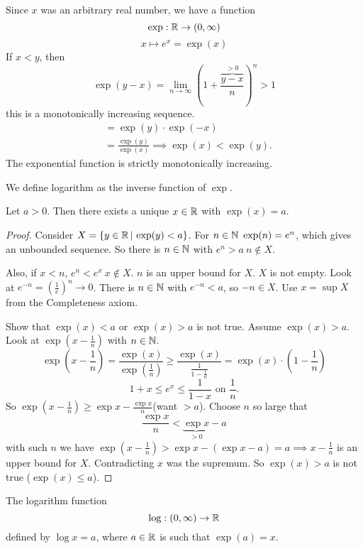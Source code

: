 \documentclass[10pt, a4paper]{article}
\begin{document}
Since $x$ was an arbitrary real number,
we have a function
\[
\exp : \mathbb{R} \rightarrow (0, \infty)
\]
\[
x \mapsto e ^ x = \exp(x)
\]
If $x < y$,
then
\[
\exp(y - x) = \lim_{n \rightarrow \infty}\left(1 + \frac{\overbrace{y - x}^{>0}}{n}\right) ^ n > 1
\]
this is a monotonically increasing sequence.
\begin{align*}
    &= \exp(y)\cdot\exp(-x) \\
    &= \frac{\exp(y)}{\exp(x)} \implies \exp(x) < \exp(y).
\end{align*}
The exponential function is strictly monotonically increasing.

We define logarithm as the inverse function of $\exp$.
\begin{theorem}
    Let $a > 0$.
    Then there exists a unique $x \in \mathbb{R}$ with $\exp(x) = a$.
    \begin{proof}
        Consider $X = \{y \in \mathbb{R}\,|\,\exp(y) < a\}$.
        For $n \in \mathbb{N}\ \exp(n) = e ^ n$,
        which gives an unbounded sequence.
        So there is $n \in \mathbb{N}$ with $e ^ n > a\ n \notin X$.
        
        Also,
        if $x < n$,
        $e ^ n < e ^ x\ x \notin X$.
        $n$ is an upper bound for $X$.
        $X$ is not empty.
        Look at $e ^ {-n} = \left(\frac{1}{e}\right) ^ n \rightarrow 0$.
        There is $n \in \mathbb{N}$ with $e ^ {-n} < a$,
        so $-n \in X$.
        Use $x = \sup X$ from the Completeness axiom.
        
        Show that $\exp(x) < a$ or $\exp(x) > a$ is not true.
        Assume $\exp(x) > a$.
        Look at $\exp\left(x - \frac{1}{n}\right)$ with $n \in \mathbb{N}$.
        \[
        \exp\left(x - \frac{1}{n}\right) = \frac{\exp(x)}{\exp\left(\frac{1}{n}\right)} \geq \frac{\exp(x)}{\frac{1}{1 - \frac{1}{n}}} = \exp(x) \cdot \left(1 - \frac{1}{n}\right)
        \]
        \[
        1 + x \leq e ^ x \leq \frac{1}{1 - x}\text{ on } \frac{1}{n}.
        \]
        So $\exp\left(x - \frac{1}{n}\right) \geq \exp x - \frac{\exp x}{n}$\quad(want $> a$).
        Choose $n$ so large that
        \[
        \frac{\exp x}{n} < \underbrace{\exp x}_{> 0} - a
        \]
        with such $n$ we have $\exp\left(x - \frac{1}{n}\right) > \exp x - (\exp x - a) = a \implies x - \frac{1}{n}$ is an upper bound for $X$. Contradicting $x$ was the supremum.
        So $\exp(x) > a$ is not true ($\exp(x) \leq a$).
    \end{proof}
\end{theorem}

\begin{definition}
    The logarithm function
    \[
    \log : (0, \infty) \rightarrow \mathbb{R}
    \]
    defined by
    $\log x = a$,
    where $a \in \mathbb{R}$ is such that $\exp(a) = x$.
\end{definition}
\end{document}
